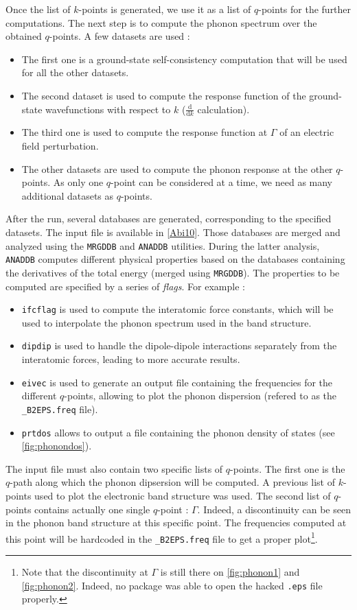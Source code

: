 \documentclass[11pt,a4paper]{article}
\begin{document}
Once the list of $k$-points is generated, we use it as a list of $q$-points for the further computations. The next step is to compute the phonon spectrum over the obtained $q$-points. A few datasets are used : 
\begin{itemize}
\item The first one is a ground-state self-consistency computation that will be used for all the other datasets. 
\item The second dataset is used to compute the response function of the ground-state wavefunctions with respect to $k$ ($\frac{\text{d}}{\text{d}k}$ calculation).
\item The third one is used to compute the response function at $\Gamma$ of an electric field perturbation.
\item The other datasets are used to compute the phonon response at the other $q$-points. As only one $q$-point can be considered at a time, we need as many additional datasets as $q$-points.
\end{itemize}
After the run, several databases are generated, corresponding to the specified datasets. The input file is available in \autoref{Abi10}. Those databases are merged and analyzed using the \texttt{MRGDDB} and \texttt{ANADDB} utilities. During the latter analysis, \texttt{ANADDB} computes different physical properties based on the databases containing the derivatives of the total energy (merged using \texttt{MRGDDB}). The properties to be computed are specified by a series of \textit{flags}. For example : 
\begin{itemize}
\item \texttt{ifcflag} is used to compute the interatomic force constants, which will be used to interpolate the phonon spectrum used in the band structure.
\item \texttt{dipdip} is used to handle the dipole-dipole interactions separately from the interatomic forces, leading to more accurate results.
\item \texttt{eivec} is used to generate an output file containing the frequencies for the different $q$-points, allowing to plot the phonon dispersion (refered to as the \texttt{\_B2EPS.freq} file).
\item \texttt{prtdos} allows to output a file containing the phonon density of states (see \autoref{fig:phonondos}).
\end{itemize}
The input file must also contain two specific lists of $q$-points. The first one is the $q$-path along which the phonon dipsersion will be computed. A previous list of $k$-points used to plot the electronic band structure was used. The second list of $q$-points contains actually one single $q$-point : $\Gamma$. Indeed, a discontinuity can be seen in the phonon band structure at this specific point. The frequencies computed at this point will be hardcoded in the \texttt{\_B2EPS.freq} file to get a proper plot\footnote{Note that the discontinuity at $\Gamma$ is still there on \autoref{fig:phonon1} and \autoref{fig:phonon2}. Indeed, no package was able to open the hacked \texttt{.eps} file properly.}.
\end{document}
